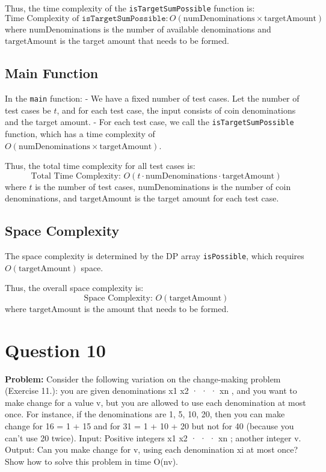 \documentclass[a4paper,12pt]{report}
\begin{document}
Thus, the time complexity of the \texttt{isTargetSumPossible} function is:
\[
\text{Time Complexity of } \texttt{isTargetSumPossible}: O(\text{numDenominations} \times \text{targetAmount})
\]
where \(\text{numDenominations}\) is the number of available denominations and \(\text{targetAmount}\) is the target amount that needs to be formed.

\subsection*{Main Function}

In the \texttt{main} function:
- We have a fixed number of test cases. Let the number of test cases be \(t\), and for each test case, the input consists of coin denominations and the target amount.
- For each test case, we call the \texttt{isTargetSumPossible} function, which has a time complexity of \(O(\text{numDenominations} \times \text{targetAmount})\).

Thus, the total time complexity for all test cases is:
\[
\text{Total Time Complexity: } O(t \cdot \text{numDenominations} \cdot \text{targetAmount})
\]
where \(t\) is the number of test cases, \(\text{numDenominations}\) is the number of coin denominations, and \(\text{targetAmount}\) is the target amount for each test case.

\subsection*{Space Complexity}

The space complexity is determined by the DP array \texttt{isPossible}, which requires \(O(\text{targetAmount})\) space.

Thus, the overall space complexity is:
\[
\text{Space Complexity: } O(\text{targetAmount})
\]
where \(\text{targetAmount}\) is the amount that needs to be formed. 

\newpage

\section*{Question 10}

\textbf{Problem:}
Consider the following variation on the change-making problem (Exercise 11.): you are given denominations x1 x2 · · · xn , and you want to make change for a value v, but you are allowed to use each denomination at most once. For instance, if the denominations are 1, 5, 10, 20, then you can make change for 16 = 1 + 15 and for 31 = 1 + 10 + 20 but not for 40 (because you can’t use 20 twice). Input: Positive integers x1 x2 · · · xn ; another integer v. Output: Can you make change for v, using each denomination xi at most once? Show how to solve this problem in time O(nv).
\end{document}
